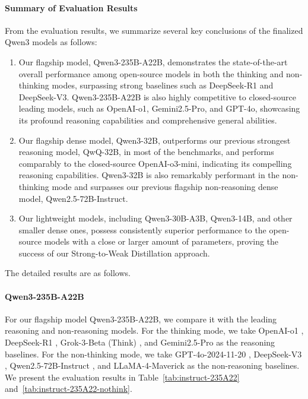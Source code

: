 \paragraph{Summary of Evaluation Results}
From the evaluation results, we summarize several key conclusions of the finalized Qwen3 models as follows:
\begin{enumerate}[label=(\arabic*)]
    \item Our flagship model, Qwen3-235B-A22B, demonstrates the state-of-the-art overall performance among open-source models in both the thinking and non-thinking modes, surpassing strong baselines such as DeepSeek-R1 and DeepSeek-V3.
    Qwen3-235B-A22B is also highly competitive to closed-source leading models, such as OpenAI-o1, Gemini2.5-Pro, and GPT-4o, showcasing its profound reasoning capabilities and comprehensive general abilities.
    \item Our flagship dense model, Qwen3-32B, outperforms our previous strongest reasoning model, QwQ-32B, in most of the benchmarks, and performs comparably to the closed-source OpenAI-o3-mini, indicating its compelling reasoning capabilities.
    Qwen3-32B is also remarkably performant in the non-thinking mode and surpasses our previous flagship non-reasoning dense model, Qwen2.5-72B-Instruct.
    \item Our lightweight models, including Qwen3-30B-A3B, Qwen3-14B, and other smaller dense ones, possess consistently superior performance to the open-source models with a close or larger amount of parameters, proving the success of our Strong-to-Weak Distillation approach.
\end{enumerate}

The detailed results are as follows.


\paragraph{Qwen3-235B-A22B}
For our flagship model Qwen3-235B-A22B, we compare it with the leading reasoning and non-reasoning models.
For the thinking mode, we take OpenAI-o1 \citep{o1}, DeepSeek-R1 \citep{r1}, Grok-3-Beta (Think) \citep{grok3}, and Gemini2.5-Pro \citep{gemini2.5} as the reasoning baselines.
For the non-thinking mode, we take GPT-4o-2024-11-20 \citep{gpt4o}, DeepSeek-V3 \citep{deepseekv3}, Qwen2.5-72B-Instruct \citep{qwen2.5}, and LLaMA-4-Maverick \citep{llama4} as the non-reasoning baselines.
We present the evaluation results in Table~\ref{tab:instruct-235A22} and~\ref{tab:instruct-235A22-nothink}.


